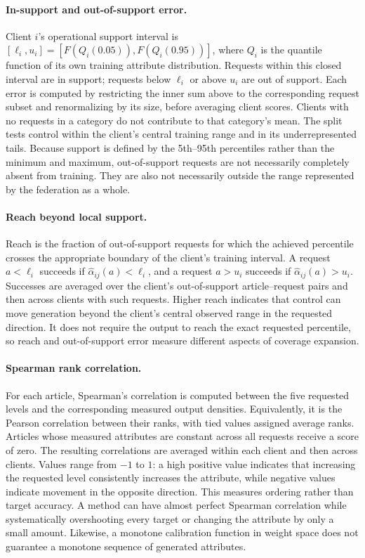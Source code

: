 \documentclass[11pt]{article}
\begin{document}
\paragraph{In-support and out-of-support error.}
Client $i$'s operational support interval is $[\ell_i,u_i]=[F(Q_i(0.05)),F(Q_i(0.95))]$, where $Q_i$ is the quantile function of its own training attribute distribution. Requests within this closed interval are in support; requests below $\ell_i$ or above $u_i$ are out of support. Each error is computed by restricting the inner sum above to the corresponding request subset and renormalizing by its size, before averaging client scores. Clients with no requests in a category do not contribute to that category's mean. The split tests control within the client's central training range and in its underrepresented tails. Because support is defined by the 5th--95th percentiles rather than the minimum and maximum, out-of-support requests are not necessarily completely absent from training. They are also not necessarily outside the range represented by the federation as a whole.

\paragraph{Reach beyond local support.}
Reach is the fraction of out-of-support requests for which the achieved percentile crosses the appropriate boundary of the client's training interval. A request $a<\ell_i$ succeeds if $\widehat\alpha_{ij}(a)<\ell_i$, and a request $a>u_i$ succeeds if $\widehat\alpha_{ij}(a)>u_i$. Successes are averaged over the client's out-of-support article--request pairs and then across clients with such requests. Higher reach indicates that control can move generation beyond the client's central observed range in the requested direction. It does not require the output to reach the exact requested percentile, so reach and out-of-support error measure different aspects of coverage expansion.

\paragraph{Spearman rank correlation.}
For each article, Spearman's correlation is computed between the five requested levels and the corresponding measured output densities. Equivalently, it is the Pearson correlation between their ranks, with tied values assigned average ranks. Articles whose measured attributes are constant across all requests receive a score of zero. The resulting correlations are averaged within each client and then across clients. Values range from $-1$ to $1$: a high positive value indicates that increasing the requested level consistently increases the attribute, while negative values indicate movement in the opposite direction. This measures ordering rather than target accuracy. A method can have almost perfect Spearman correlation while systematically overshooting every target or changing the attribute by only a small amount. Likewise, a monotone calibration function in weight space does not guarantee a monotone sequence of generated attributes.
\end{document}
